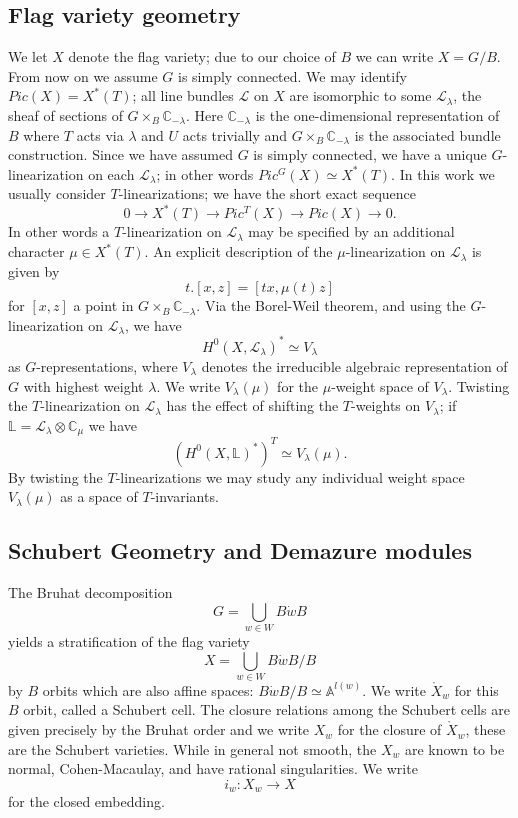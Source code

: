 \documentclass[12pt,reqno]{amsart}
\theoremstyle{definition}
\begin{document}
\subsection{Flag variety geometry}
We let $X$ denote the flag variety; due to our choice of $B$ we can write $X=G/B$. From now on we assume $G$ is simply connected. We may identify $Pic(X) = X^*(T)$; all line bundles $\mathscr{L}$ on $X$ are isomorphic to some $\mathscr{L}_{\lambda}$, the sheaf of sections of $G \times_B \mathbb{C}_{-\lambda}$. Here $\mathbb{C}_{-\lambda}$ is the one-dimensional representation of $B$ where $T$ acts via $\lambda$ and $U$ acts trivially and $G \times_B \mathbb{C}_{-\lambda}$ is the associated bundle construction. Since we have assumed $G$ is simply connected, we have a unique $G$-linearization on each $\mathscr{L}_{\lambda}$; in other words $Pic^G(X) \simeq X^*(T)$. In this work we usually consider $T$-linearizations; we have the short exact sequence \[0 \rightarrow X^*(T) \rightarrow Pic^{T}(X) \rightarrow Pic(X) \rightarrow 0.\] In other words a $T$-linearization on $\mathscr{L}_{\lambda}$ may be specified by an additional character $\mu \in X^*(T)$. An explicit description of the $\mu$-linearization on $\mathscr{L}_{\lambda}$ is given by \[t.[x, z]=[tx, \mu(t)z]\] for $[x,z]$ a point in $G \times_B \mathbb{C}_{-\lambda}$. 
Via the Borel-Weil theorem, and using the $G$-linearization on $\mathscr{L}_{\lambda}$, we have \[H^0(X, \mathscr{L}_{\lambda})^* \simeq V_{\lambda}\] as $G$-representations, where $V_{\lambda}$ denotes the irreducible algebraic representation of $G$ with highest weight $\lambda$. We write $V_{\lambda}(\mu)$ for the $\mu$-weight space of $V_{\lambda}$. Twisting the $T$-linearization on $\mathscr{L}_{\lambda}$ has the effect of shifting the $T$-weights on $V_{\lambda}$; if $\mathbb{L}=\mathscr{L}_{\lambda} \otimes \mathbb{C}_{\mu}$ we have \[(H^0(X, \mathbb{L})^*)^T \simeq V_{\lambda}(\mu).\]  By twisting the $T$-linearizations we may study any individual weight space $V_{\lambda}(\mu)$ as a space of $T$-invariants.






\subsection{Schubert Geometry and Demazure modules}
The Bruhat decomposition \[G=\bigcup_{w \in W} B \dot w B\] yields a stratification of the flag variety  \[X=\bigcup_{w \in W} B \dot wB/B\] by $B$ orbits which are also affine spaces: $B \dot{w} B/B \simeq \mathbb{A}^{l(w)}$. We write $\mathring{X}_w$ for this $B$ orbit, called a Schubert cell. The closure relations among the Schubert cells are given precisely by the Bruhat order and we write $X_w$ for the closure of $\mathring{X}_w$, these are the Schubert varieties. While in general not smooth, the $X_w$ are known to be normal, Cohen-Macaulay, and have rational singularities. We write \[i_w: X_w \rightarrow X\] for the closed embedding.
\end{document}

